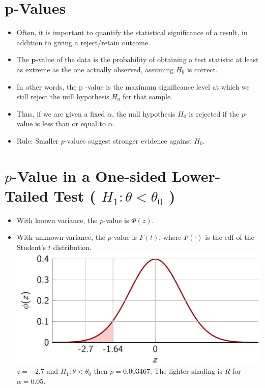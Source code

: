 \documentclass[10pt]{article}
\begin{document}
\section*{p-Values}
\begin{itemize}
  \item Often, it is important to quantify the statistical significance of a result, in addition to giving a reject/retain outcome.
  \item The $\mathbf{p}$-value of the data is the probability of obtaining a test statistic at least as extreme as the one actually observed, assuming $H_{0}$ is correct.
  \item In other words, the p -value is the maximum significance level at which we still reject the null hypothesis $H_{0}$ for that sample.
  \item Thus, if we are given a fixed $\alpha$, the null hypothesis $H_{0}$ is rejected if the $p$-value is less than or equal to $\alpha$.
  \item Rule: Smaller $p$-values suggest stronger evidence against $H_{0}$.
\end{itemize}

\section*{$p$-Value in a One-sided Lower-Tailed Test ( $H_{1}: \theta<\theta_{0}$ )}
\begin{itemize}
  \item With known variance, the $p$-value is $\Phi(z)$.
  \item With unknown variance, the $p$-value is $F(t)$, where $F(\cdot)$ is the cdf of the Student's $t$ distribution.\\
\includegraphics[max width=\textwidth, center]{2025_05_12_2c033a5f0417cd8b136fg-50}\\
$z=-2.7$ and $H_{1}: \theta<\theta_{0}$ then $p=0.003467$. The lighter shading is $R$ for $\alpha=0.05$.
\end{itemize}
\end{document}
